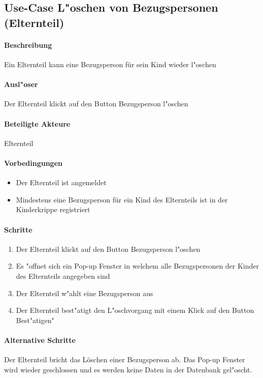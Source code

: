 	
	\newpage
	\subsection{Use-Case L"oschen von Bezugspersonen (Elternteil)}
	\paragraph{Beschreibung}
		Ein Elternteil kann eine Bezugsperson für sein Kind wieder l"oschen
		\paragraph{Ausl"oser}
		Der Elternteil klickt auf den Button \dq Bezugsperson l"oschen\dq
		\paragraph{Beteiligte Akteure}   \leavevmode \newline
		Elternteil
		\paragraph{Vorbedingungen}
		\begin{itemize}
			\item Der Elternteil ist angemeldet
			\item Mindestens eine Bezugsperson für ein Kind des Elternteils ist in der Kinderkrippe registriert
		\end{itemize}
		
		\paragraph{Schritte}
		\begin{enumerate}
			\item Der Elternteil klickt auf den Button \dq Bezugsperson l"oschen\dq
			\item Es "offnet sich ein Pop-up Fenster in welchem alle Bezugspersonen der Kinder des Elternteils angegeben sind
			\item Der Elternteil w"ahlt eine Bezugsperson aus
			\item Der Elternteil best"atigt den L"oschvorgang mit einem Klick auf den Button \dq Best"atigen"\dq 
		\end{enumerate}
		
		\paragraph{Alternative Schritte}
		Der Elternteil bricht das Löschen einer Bezugsperson ab. Das Pop-up Fenster wird wieder geschlossen und es werden keine Daten in der Datenbank gel"oscht. 	
